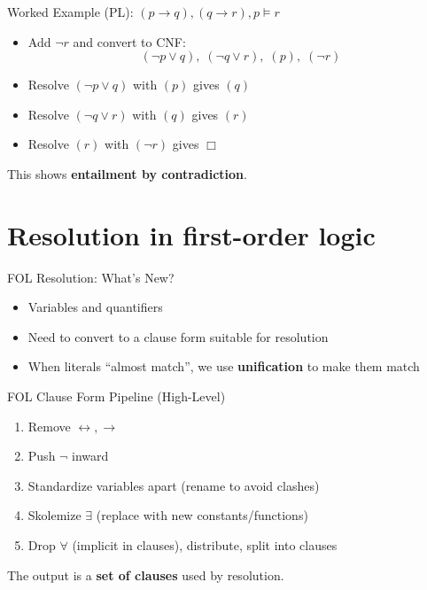\documentclass[aspectratio=169]{beamer}
\begin{document}
\begin{frame}{Worked Example (PL): $(p\rightarrow q),(q\rightarrow r),p \models r$}
  \begin{itemize}[<+->]
    \item Add $\lnot r$ and convert to CNF:
    \[
      (\lnot p \lor q),\;(\lnot q \lor r),\;(p),\;(\lnot r)
    \]
    \item Resolve $(\lnot p \lor q)$ with $(p)$ gives $(q)$
    \item Resolve $(\lnot q \lor r)$ with $(q)$ gives $(r)$
    \item Resolve $(r)$ with $(\lnot r)$ gives $\Box$
  \end{itemize}
  This shows \textbf{entailment by contradiction}.
\end{frame}

\section{Resolution in first-order logic}
\label{sec:resfol}

\begin{frame}{FOL Resolution: What's New?}
  \begin{itemize}[<+->]
    \item Variables and quantifiers
    \item Need to convert to a clause form suitable for resolution
    \item When literals ``almost match'', we use \textbf{unification} to make them match
  \end{itemize}
\end{frame}

\begin{frame}{FOL Clause Form Pipeline (High-Level)}
  \begin{enumerate}[<+->]
    \item Remove $\leftrightarrow,\rightarrow$
    \item Push $\lnot$ inward
    \item Standardize variables apart (rename to avoid clashes)
    \item Skolemize $\exists$ (replace with new constants/functions)
    \item Drop $\forall$ (implicit in clauses), distribute, split into clauses
  \end{enumerate}
  \vspace{0.3em}
  \small The output is a \textbf{set of clauses} used by resolution.
\end{frame}
\end{document}
